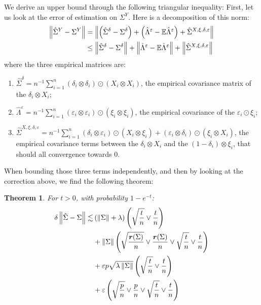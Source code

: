 \documentclass{article}
\numberwithin{equation}{section}
\newtheorem{theorem}{Theorem}
\numberwithin{equation}{section}
\begin{document}
        We derive an upper bound through the following triangular inequality:        First, let us look at the error of estimation on $\Sigma^Y$. Here is a decomposition of this norm:
        \begin{equation}
            \begin{split}
            \left\Vert \hat{\Sigma}^Y - \Sigma^Y \right\Vert & = \left\Vert \left(\hat{\Sigma}^\delta - \Sigma^\delta \right) + \left( \hat{\Lambda}^\varepsilon - \mathbb{E} \hat{\Lambda}^\varepsilon \right) + \hat{\Sigma}^{X, \xi, \delta, \varepsilon}  \right\Vert\\
            & \leq \left\Vert \hat{\Sigma}^\delta - \Sigma^\delta  \right\Vert + \left\Vert \hat{\Lambda}^\varepsilon - \mathbb{E} \hat{\Lambda}^\varepsilon  \right\Vert + \left\Vert \hat{\Sigma}^{X, \xi, \delta, \varepsilon}  \right\Vert
            \end{split}
        \end{equation}
        where the three empirical matrices are:
        \begin{enumerate}
            \item $\hat{\Sigma}^\delta = n^{-1} \sum_{i=1}^n (\delta_i \otimes \delta_i) \odot (X_i \otimes X_i)$, the empirical covariance matrix of the $\delta_i \otimes X_i$;
            \item $\hat{\Lambda}^\varepsilon = n^{-1} \sum_{i=1}^n \left( \varepsilon_i \otimes \varepsilon_i\right) \odot (\xi_i \otimes \xi_i)$, the empirical covariance of the $\varepsilon_i\odot \xi_i$;
            \item $\hat{\Sigma}^{X,\xi,\delta, \varepsilon} = n^{-1} \sum_{i=1}^n \left(\delta_i \otimes \varepsilon_i\right)\odot(X_i \otimes \xi_i) + (\varepsilon_i\otimes \delta_i)\odot(\xi_i \otimes X_i)$, the empirical covariance terms between the $\delta_i \otimes X_i$ and the $(1-\delta_i)\otimes\xi_i$, that should all convergence towards $0$.
        \end{enumerate}
        When bounding those three terms independently, and then by looking at the correction above, we find the following theorem:
        \begin{theorem}
        For $t > 0$, with probability $1 - e^{-t}$:
        \begin{equation}
            \begin{split}
            \delta\left\Vert \hat{\Sigma} - \Sigma \right\Vert \lesssim & \left(\left\Vert \Sigma \right\Vert+ \lambda \right)\left(\sqrt{\frac{t}{n}} \lor \frac{t}{n}\right)\\
            & + \left\Vert \Sigma \right\Vert \left( \sqrt{\frac{\bm{r}(\Sigma)}{n}} \lor \frac{\bm{r}(\Sigma)}{n} \lor \sqrt{\frac{t}{n}} \lor \frac{t}{n}\right)\\
            & + \varepsilon p\sqrt{\lambda \left\Vert \Sigma \right\Vert}\left(\sqrt{\frac{t}{n}} \lor \frac{t}{n}\right) \\
            & + \varepsilon \left( \sqrt{\frac{p}{n}} \lor \frac{p}{n} \lor \sqrt{\frac{t}{n}} \lor \frac{t}{n}\right)
            \end{split}
        \end{equation}
        \end{theorem}
\end{document}
